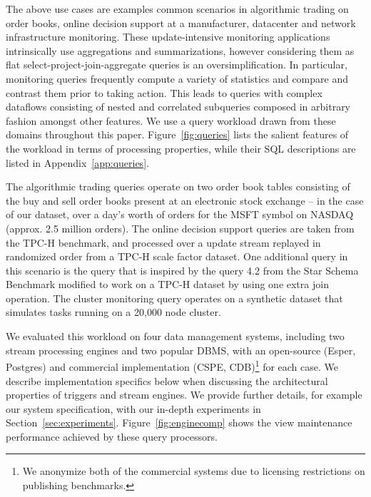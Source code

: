 \vspace{1mm}
The above use cases are examples common scenarios in algorithmic trading on
order books, online decision support at a manufacturer, datacenter and network
infrastructure monitoring. 
These update-intensive monitoring applications intrinsically use aggregations
and summarizations, however considering them as flat
select-project-join-aggregate queries is an oversimplification.
In particular, monitoring queries frequently compute a variety of statistics and
compare and contrast them prior to taking action. This leads to queries with
complex dataflows consisting of nested and correlated subqueries composed in
arbitrary fashion amongst other features.
We use a query workload drawn from these domains throughout this paper.
Figure~\ref{fig:queries} lists the salient features of the workload in
terms of processing properties, while their SQL descriptions are listed in
Appendix~\ref{app:queries}.

The algorithmic trading queries operate on two order book tables consisting of
the buy and sell order books present at an electronic stock exchange -- in the
case of our dataset, over a day's worth of orders for the MSFT symbol on NASDAQ
(approx. 2.5 million orders). The online decision support queries are taken from
the TPC-H benchmark, and processed over a update stream replayed in randomized
order from a TPC-H scale factor  dataset. One additional query in this
scenario is the  query that is inspired by the query 4.2 from the
Star Schema Benchmark modified to work on a TPC-H dataset by using one extra
join operation. The cluster monitoring query operates on a synthetic dataset
that simulates tasks running on a 20,000 node cluster.


We evaluated this workload on four data management systems, including two stream
processing engines and two popular DBMS, with an open-source (Esper, Postgres)
and commercial implementation (CSPE, CDB)\footnote{We anonymize both of the
commercial systems due to licensing restrictions on publishing benchmarks.} for
each case. We describe implementation specifics below when discussing the
architectural properties of triggers and stream engines. We provide further
details, for example our system specification, with our in-depth experiments in
Section~\ref{sec:experiments}. Figure~\ref{fig:enginecomp} shows the view
maintenance performance achieved by these query processors.

